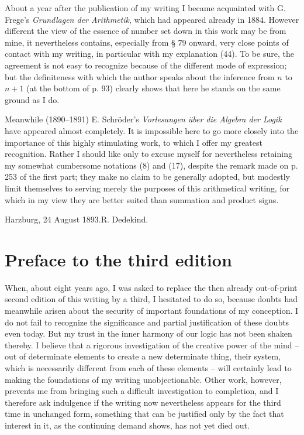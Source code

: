 \documentclass[11pt]{article}
\begin{document}
About a year after the publication of my writing I became acquainted with G. Frege's \emph{Grundlagen der Arithmetik}, which had appeared already in 1884. However different the view of the essence of number set down in this work may be from mine, it nevertheless contains, especially from § 79 onward, very close points of contact with my writing, in particular with my explanation (44). To be sure, the agreement is not easy to recognize because of the different mode of expression; but the definiteness with which the author speaks about the inference from $n$ to $n+1$ (at the bottom of p. 93) clearly shows that here he stands on the same ground as I do.

Meanwhile (1890--1891) E. Schröder's \emph{Vorlesungen über die Algebra der Logik} have appeared almost completely. It is impossible here to go more closely into the importance of this highly stimulating work, to which I offer my greatest recognition. Rather I should like only to excuse myself for nevertheless retaining my somewhat cumbersome notations (8) and (17), despite the remark made on p. 253 of the first part; they make no claim to be generally adopted, but modestly limit themselves to serving merely the purposes of this arithmetical writing, for which in my view they are better suited than summation and product signs.

\begin{flushright}Harzburg, 24 August 1893.\qquad R. Dedekind.\end{flushright}

\section*{Preface to the third edition}

When, about eight years ago, I was asked to replace the then already out-of-print second edition of this writing by a third, I hesitated to do so, because doubts had meanwhile arisen about the security of important foundations of my conception. I do not fail to recognize the significance and partial justification of these doubts even today. But my trust in the inner harmony of our logic has not been shaken thereby. I believe that a rigorous investigation of the creative power of the mind -- out of determinate elements to create a new determinate thing, their system, which is necessarily different from each of these elements -- will certainly lead to making the foundations of my writing unobjectionable. Other work, however, prevents me from bringing such a difficult investigation to completion, and I therefore ask indulgence if the writing now nevertheless appears for the third time in unchanged form, something that can be justified only by the fact that interest in it, as the continuing demand shows, has not yet died out.
\end{document}
